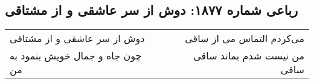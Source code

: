 \begin{center}
\section*{رباعی شماره ۱۸۷۷: دوش از سر عاشقی و از مشتاقی}
\label{sec:1877}
\begin{longtable}{l p{0.5cm} r}
دوش از سر عاشقی و از مشتاقی
&&
می‌کردم التماس می از ساقی
\\
چون جاه و جمال خویش بنمود به من
&&
من نیست شدم بماند ساقی ساقی
\\
\end{longtable}
\end{center}
